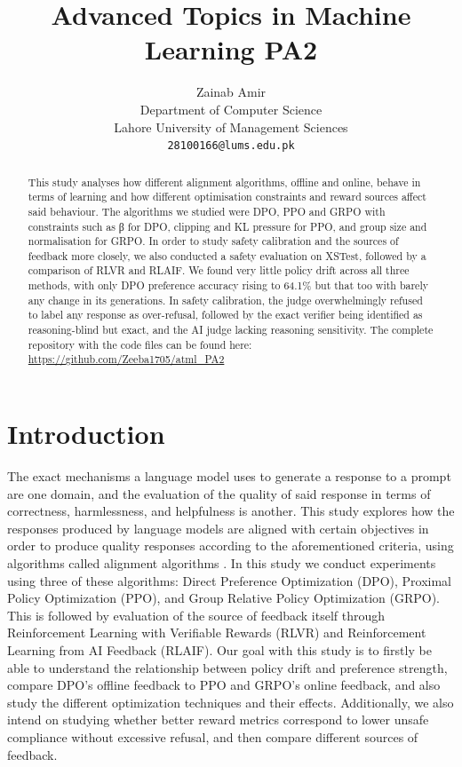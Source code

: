 \documentclass{article}
\title{Advanced Topics in Machine Learning PA2}
\author{%
  Zainab Amir \\
  Department of Computer Science\\
  Lahore University of Management Sciences\\
  \texttt{28100166@lums.edu.pk} \\
}
\begin{document}
\maketitle


\begin{abstract}
This study analyses how different alignment algorithms, offline and online, behave in terms of learning and how different optimisation constraints and reward sources affect said behaviour. The algorithms we studied were DPO, PPO and GRPO with constraints such as β for DPO, clipping and KL pressure for PPO, and group size and normalisation for GRPO. In order to study safety calibration and the sources of feedback more closely, we also conducted a safety evaluation on XSTest, followed by a comparison of RLVR and RLAIF. We found very little policy drift across all three methods, with only DPO preference accuracy rising to 64.1\% but that too with barely any change in its generations. In safety calibration, the judge overwhelmingly refused to label any response as over-refusal, followed by the exact verifier being identified as reasoning-blind but exact, and the AI judge lacking reasoning sensitivity. The complete repository with the code files can be found here: \url{https://github.com/Zeeba1705/atml_PA2}
\end{abstract}




\section{Introduction}
\label{sec:introduction}
 The exact mechanisms a language model uses to generate a response to a prompt are one domain, and the evaluation of the quality of said response in terms of correctness, harmlessness, and helpfulness is another. This study explores how the responses produced by language models are aligned with certain objectives in order to produce quality responses according to the aforementioned criteria, using algorithms called alignment algorithms \citep{ouyang2022instructgpt}. In this study we conduct experiments using three of these algorithms: Direct Preference Optimization (DPO), Proximal Policy Optimization (PPO), and Group Relative Policy Optimization (GRPO). This is followed by evaluation of the source of feedback itself through Reinforcement Learning with Verifiable Rewards (RLVR) and Reinforcement Learning from AI Feedback (RLAIF). Our goal with this study is to firstly be able to understand the relationship between policy drift and preference strength, compare DPO's offline feedback to PPO and GRPO's online feedback, and also study the different optimization techniques and their effects. Additionally, we also intend on studying whether better reward metrics correspond to lower unsafe compliance without excessive refusal, and then compare different sources of feedback.
\end{document}
